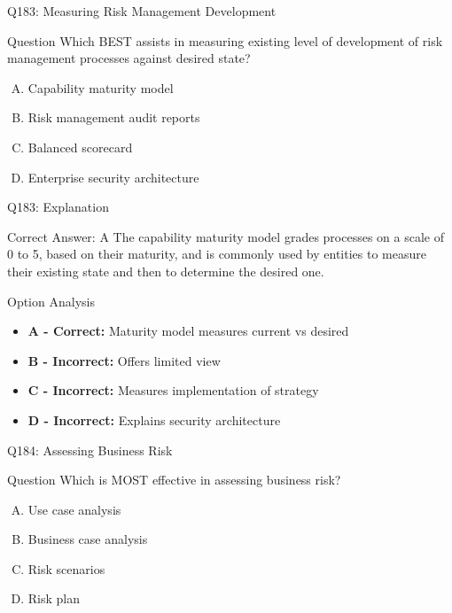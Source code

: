 \documentclass{beamer}
\begin{document}
	\begin{frame}{Q183: Measuring Risk Management Development}
		\begin{block}{Question}
			Which BEST assists in measuring existing level of development of risk management processes against desired state?
		\end{block}
		\begin{enumerate}[(A)]
			\item Capability maturity model
			\item Risk management audit reports
			\item Balanced scorecard
			\item Enterprise security architecture
		\end{enumerate}
	\end{frame}
	
	\begin{frame}{Q183: Explanation}
		\begin{block}{Correct Answer: A}
			The capability maturity model grades processes on a scale of 0 to 5, based on their maturity, and is commonly used by entities to measure their existing state and then to determine the desired one.
		\end{block}
		\begin{block}{Option Analysis}
			\begin{itemize}
				\item \textbf{A - Correct:} Maturity model measures current vs desired
				\item \textbf{B - Incorrect:} Offers limited view
				\item \textbf{C - Incorrect:} Measures implementation of strategy
				\item \textbf{D - Incorrect:} Explains security architecture
			\end{itemize}
		\end{block}
	\end{frame}
	
	\begin{frame}{Q184: Assessing Business Risk}
		\begin{block}{Question}
			Which is MOST effective in assessing business risk?
		\end{block}
		\begin{enumerate}[(A)]
			\item Use case analysis
			\item Business case analysis
			\item Risk scenarios
			\item Risk plan
		\end{enumerate}
	\end{frame}
	
\end{document}
